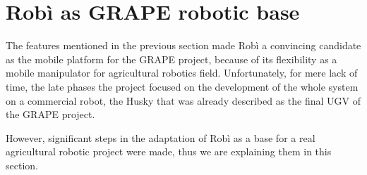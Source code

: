 \section{Robì as GRAPE robotic base}
The features mentioned in the previous section made Robì a convincing candidate as the mobile platform for the \ac{GRAPE} project, because of its flexibility as a mobile manipulator for agricultural robotics field. Unfortunately, for mere lack of time, the late phases the project focused on the development of the whole system on a commercial robot, the Husky that was already described as the final \ac{UGV} of the \ac{GRAPE} project.
\par However, significant steps in the adaptation of Robì as a base for a real agricultural robotic project were made, thus we are explaining them in this section.

